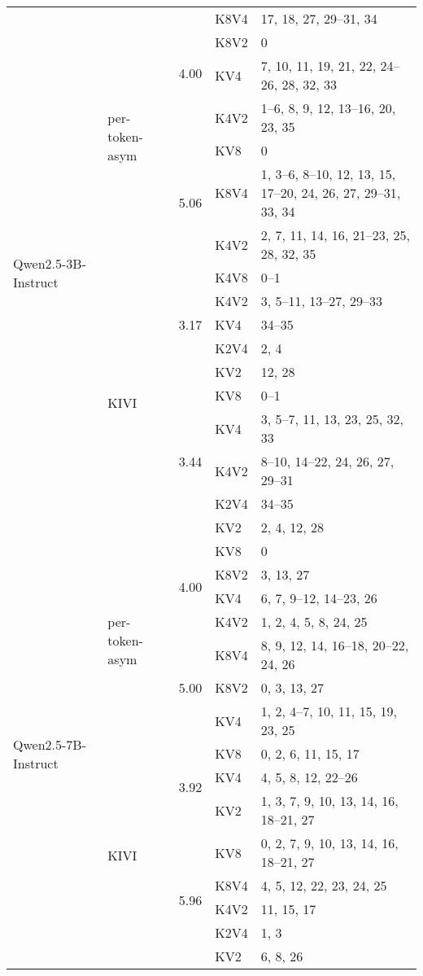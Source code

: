 \begin{table}[h!]
{\begin{tabular}{p{1.7in} p{1.3in} p{0.7in} p{0.8in} p{3.5in}}
\multirow{17}{*}{Qwen2.5-3B-Instruct}
 & \multirow{7}{*}{per-token-asym}
    & \multirow{4}{*}{4.00}
     & K8V4 & 17, 18, 27, 29--31, 34 \\
 & & & K8V2 & 0 \\
 & & & KV4 & 7, 10, 11, 19, 21, 22, 24--26, 28, 32, 33 \\
 & & & K4V2 & 1--6, 8, 9, 12, 13--16, 20, 23, 35 \\
\cline{3-5}
 & 
   & \multirow{3}{*}{5.06}
      & KV8 & 0 \\
 & & & K8V4 & 1, 3--6, 8--10, 12, 13, 15, 17--20, 24, 26, 27, 29--31, 33, 34 \\
 & & & K4V2 & 2, 7, 11, 14, 16, 21--23, 25, 28, 32, 35 \\
\cline{2-5}
  & \multirow{10}{*}{KIVI}
    & \multirow{5}{*}{3.17}
      & K4V8 & 0--1 \\
 & & & K4V2 & 3, 5--11, 13--27, 29--33 \\
 & & & KV4 & 34--35 \\
 & & & K2V4 & 2, 4 \\
 & & & KV2 & 12, 28 \\
\cline{3-5}
 & 
   & \multirow{5}{*}{3.44}
      & KV8 & 0--1 \\
 & & & KV4 & 3, 5--7, 11, 13, 23, 25, 32, 33 \\
 & & & K4V2 & 8--10, 14--22, 24, 26, 27, 29--31 \\
 & & & K2V4 & 34--35 \\
 & & & KV2 & 2, 4, 12, 28 \\
 \hline


\multirow{15}{*}{Qwen2.5-7B-Instruct}
  & \multirow{7}{*}{per-token-asym}
    & \multirow{4}{*}{4.00}
       & KV8 & 0 \\
 & & & K8V2 & 3, 13, 27 \\
 & & & KV4 & 6, 7, 9--12, 14--23, 26 \\
 & & & K4V2 & 1, 2, 4, 5, 8, 24, 25 \\
\cline{3-5}
 & 
   & \multirow{3}{*}{5.00}
       & K8V4 & 8, 9, 12, 14, 16--18, 20--22, 24, 26 \\
 & & & K8V2 & 0, 3, 13, 27 \\
 & & & KV4 & 1, 2, 4--7, 10, 11, 15, 19, 23, 25 \\
\cline{2-5}
 & \multirow{8}{*}{KIVI}
    & \multirow{3}{*}{3.92}
       & KV8 & 0, 2, 6, 11, 15, 17 \\
 & & & KV4 & 4, 5, 8, 12, 22--26 \\
 & & & KV2 & 1, 3, 7, 9, 10, 13, 14, 16, 18--21, 27 \\
\cline{3-5}
 & 
   & \multirow{5}{*}{5.96}
       & KV8 & 0, 2, 7, 9, 10, 13, 14, 16, 18--21, 27 \\
 & & & K8V4 & 4, 5, 12, 22, 23, 24, 25 \\
& & & K4V2 & 11, 15, 17 \\
 & & & K2V4 & 1, 3 \\
 & & & KV2 & 6, 8, 26 \\
\bottomrule


\end{tabular}}
\end{table}
